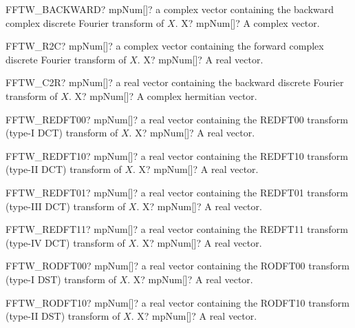 \documentclass[12pt,a4paper,openany]{book}
\begin{document}
\begin{mpFunctionsExtract}
\mpFunctionOne
{FFTW\_BACKWARD? mpNum[]? a complex vector containing the backward complex discrete Fourier transform of $X$.}
{X? mpNum[]? A complex vector.}
\end{mpFunctionsExtract}

\begin{mpFunctionsExtract}
\mpFunctionOne
{FFTW\_R2C? mpNum[]? a complex vector containing the forward complex discrete Fourier transform of $X$.}
{X? mpNum[]? A real vector.}
\end{mpFunctionsExtract}

\begin{mpFunctionsExtract}
\mpFunctionOne
{FFTW\_C2R? mpNum[]? a real vector containing the backward  discrete Fourier transform of $X$.}
{X? mpNum[]? A complex hermitian vector.}
\end{mpFunctionsExtract}

\begin{mpFunctionsExtract}
\mpFunctionOne
{FFTW\_REDFT00? mpNum[]? a real vector containing the REDFT00 transform (type-I DCT) transform of $X$.}
{X? mpNum[]? A real vector.}
\end{mpFunctionsExtract}

\begin{mpFunctionsExtract}
\mpFunctionOne
{FFTW\_REDFT10? mpNum[]? a real vector containing the REDFT10 transform (type-II DCT) transform of $X$.}
{X? mpNum[]? A real vector.}
\end{mpFunctionsExtract}

\begin{mpFunctionsExtract}
\mpFunctionOne
{FFTW\_REDFT01? mpNum[]? a real vector containing the REDFT01 transform (type-III DCT) transform of $X$.}
{X? mpNum[]? A real vector.}
\end{mpFunctionsExtract}

\begin{mpFunctionsExtract}
\mpFunctionOne
{FFTW\_REDFT11? mpNum[]? a real vector containing the REDFT11 transform (type-IV DCT) transform of $X$.}
{X? mpNum[]? A real vector.}
\end{mpFunctionsExtract}

\begin{mpFunctionsExtract}
\mpFunctionOne
{FFTW\_RODFT00? mpNum[]? a real vector containing the RODFT00 transform (type-I DST) transform of $X$.}
{X? mpNum[]? A real vector.}
\end{mpFunctionsExtract}

\begin{mpFunctionsExtract}
\mpFunctionOne
{FFTW\_RODFT10? mpNum[]? a real vector containing the RODFT10 transform (type-II DST) transform of $X$.}
{X? mpNum[]? A real vector.}
\end{mpFunctionsExtract}
\end{document}
